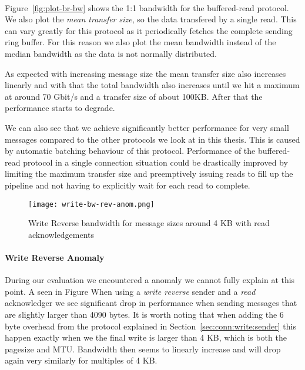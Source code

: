 \paragraph{} Figure~\ref{fig:plot-br-bw} shows the 1:1 bandwidth for the buffered-read protocol. We also plot the 
\emph{mean transfer size}, so the data transfered by a single read. This can vary greatly for this protocol as it periodically
fetches the complete sending ring buffer. For this reason we also plot the mean bandwidth instead of the median bandwidth 
as the data is not normally distributed.

As expected with increasing message size the mean transfer size also increases linearly and with that the 
total bandwidth also increases until we hit a maximum at around 70 Gbit/s and a transfer size of about 100KB. After that 
the performance starts to degrade. 

We can also see that we achieve significantly better performance for very small messages compared to the other protocols we
look at in this thesis. This is caused by automatic batching behaviour of this protocol. Performance of the buffered-read
protocol in a single connection situation could be drastically improved by limiting the maximum transfer size and 
preemptively issuing reads to fill up the pipeline and not having to explicitly wait for each
read to complete.


\begin{figure}[h]
\texttt{[image: write-bw-rev-anom.png]}
\caption{Write Reverse bandwidth for message sizes around 4 KB with read acknowledgements}
\label{fig:plot-write-rev-anom}
\end{figure}

\paragraph{Write Reverse Anomaly} During our evaluation we encountered a anomaly we cannot fully explain at
this point. A seen in Figure  When using a \emph{write reverse} sender and a \emph{read} acknowledger we see 
significant drop in performance when sending messages that are slightly larger than 4090 bytes. It is worth 
noting that when adding the 6 byte overhead from the protocol explained in Section~\ref{sec:conn:write:sender}
this happen exactly when we the final write is larger than 4 KB, which is both the pagesize and MTU. Bandwidth
then seems to linearly increase and will drop again very similarly for multiples of 4 KB.

